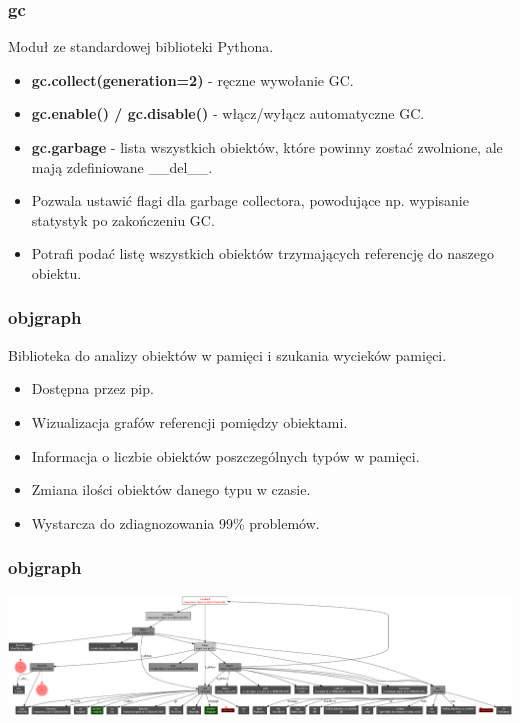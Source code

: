 \documentclass{beamer}
\begin{document}
    \begin{frame}
        \frametitle{gc}
        Moduł ze standardowej biblioteki Pythona.
        \begin{itemize}
            \item \textbf{gc.collect(generation=2)} - ręczne wywołanie GC.
            \item \textbf{gc.enable() / gc.disable()} - włącz/wyłącz automatyczne GC.
            \item \textbf{gc.garbage} - lista wszystkich obiektów, które powinny zostać zwolnione, ale mają zdefiniowane \_\_del\_\_.
            \item Pozwala ustawić flagi dla garbage collectora, powodujące np. wypisanie statystyk po zakończeniu GC.
            \item Potrafi podać listę wszystkich obiektów trzymających referencję do naszego obiektu.
        \end{itemize}
    \end{frame}

    \begin{frame}
        \frametitle{objgraph}
        Biblioteka do analizy obiektów w pamięci i szukania wycieków pamięci.
        \begin{itemize}
            \item Dostępna przez pip.
            \item Wizualizacja grafów referencji pomiędzy obiektami.
            \item Informacja o liczbie obiektów poszczególnych typów w pamięci.
            \item Zmiana ilości obiektów danego typu w czasie.
            \item Wystarcza do zdiagnozowania 99\% problemów.
        \end{itemize}
    \end{frame}

    \begin{frame}
        \frametitle{objgraph}
        \includegraphics[height=0.3\textheight]{objgraph_example.png}
    \end{frame}
\end{document}
